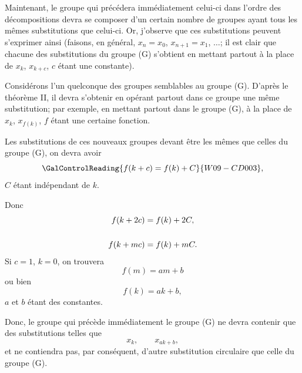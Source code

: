 
Maintenant, le groupe qui précédera immédiatement celui-ci
dans l'ordre des décompositions devra se composer d'un certain
nombre de groupes ayant tous les mêmes substitutions que
celui-ci. Or, j'observe que ces substitutions peuvent s'exprimer
ainsi (faisons, en général, $x_{n}=x_{0}$, $x_{n+1}=x_{1}$, $\ldots$; il est clair
que chacune des substitutions du groupe (G) s'obtient en mettant
partout à la place de $x_{k}$, $x_{k+c}$, $c$ étant une constante).

Considérons l'un quelconque des groupes semblables au
groupe (G). D'après le théorème II, il devra s'obtenir en opérant
partout dans ce groupe une même substitution; par exemple, en
mettant partout dans le groupe (G), à la place de $x_{k}$, $x_{f(k)}$, $f$ étant
une certaine fonction.

Les substitutions de ces nouveaux groupes devant être les
mêmes que celles du groupe (G), on devra avoir
\[
\GalControlReading{f(k+c)=f(k)+C}{W09-CD003},
\]
$C$ étant indépendant de $k$.

Donc
\[
\begin{aligned}
f(k+2c)&=f(k)+2C,\\
&\hspace{2em}\dotfill\\
f(k+mc)&=f(k)+mC.
\end{aligned}
\]
Si $c=1$, $k=0$, on trouvera
\[
f(m)=am+b
\]
ou bien
\[
f(k)=ak+b,
\]
$a$ et $b$ étant des constantes.

Donc, le groupe qui précède immédiatement le groupe (G) ne
devra contenir que des substitutions telles que
\[
x_{k},\qquad x_{ak+b},
\]
et ne contiendra pas, par conséquent, d'autre substitution circulaire
que celle du groupe (G).
